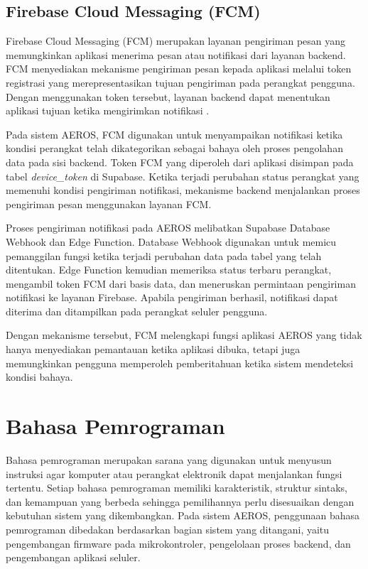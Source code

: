 \subsection{Firebase Cloud Messaging (FCM)}
\label{subsec:FCM}

Firebase Cloud Messaging (FCM) merupakan layanan pengiriman pesan yang memungkinkan aplikasi menerima pesan atau notifikasi dari layanan backend. FCM menyediakan mekanisme pengiriman pesan kepada aplikasi melalui token registrasi yang merepresentasikan tujuan pengiriman pada perangkat pengguna. Dengan menggunakan token tersebut, layanan backend dapat menentukan aplikasi tujuan ketika mengirimkan notifikasi \cite{firebase_fcm}.

Pada sistem AEROS, FCM digunakan untuk menyampaikan notifikasi ketika kondisi perangkat telah dikategorikan sebagai bahaya oleh proses pengolahan data pada sisi backend. Token FCM yang diperoleh dari aplikasi disimpan pada tabel \textit{device\_token} di Supabase. Ketika terjadi perubahan status perangkat yang memenuhi kondisi pengiriman notifikasi, mekanisme backend menjalankan proses pengiriman pesan menggunakan layanan FCM.

Proses pengiriman notifikasi pada AEROS melibatkan Supabase Database Webhook dan Edge Function. Database Webhook digunakan untuk memicu pemanggilan fungsi ketika terjadi perubahan data pada tabel yang telah ditentukan. Edge Function kemudian memeriksa status terbaru perangkat, mengambil token FCM dari basis data, dan meneruskan permintaan pengiriman notifikasi ke layanan Firebase. Apabila pengiriman berhasil, notifikasi dapat diterima dan ditampilkan pada perangkat seluler pengguna.

Dengan mekanisme tersebut, FCM melengkapi fungsi aplikasi AEROS yang tidak hanya menyediakan pemantauan ketika aplikasi dibuka, tetapi juga memungkinkan pengguna memperoleh pemberitahuan ketika sistem mendeteksi kondisi bahaya.


\section{Bahasa Pemrograman}
\label{sec:Bahasa_Pemrograman}

Bahasa pemrograman merupakan sarana yang digunakan untuk menyusun instruksi agar komputer atau perangkat elektronik dapat menjalankan fungsi tertentu. Setiap bahasa pemrograman memiliki karakteristik, struktur sintaks, dan kemampuan yang berbeda sehingga pemilihannya perlu disesuaikan dengan kebutuhan sistem yang dikembangkan. Pada sistem AEROS, penggunaan bahasa pemrograman dibedakan berdasarkan bagian sistem yang ditangani, yaitu pengembangan firmware pada mikrokontroler, pengelolaan proses backend, dan pengembangan aplikasi seluler.

